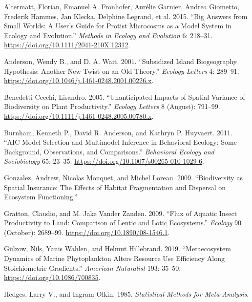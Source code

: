 \documentclass[
]{article}
\newlength{\cslhangindent}
\newlength{\cslentryspacingunit} %
\newenvironment{CSLReferences}[2] %
 {%
  \setlength{\parindent}{0pt}
  \ifodd #1
  \let\oldpar\par
  \def\par{\hangindent=\cslhangindent\oldpar}
  \fi
  \setlength{\parskip}{#2\cslentryspacingunit}
 }%
 {}
\begin{document}
\hypertarget{refs}{}
\begin{CSLReferences}{1}{0}
\leavevmode{}%
Altermatt, Florian, Emanuel A. Fronhofer, Aurélie Garnier, Andrea
Giometto, Frederik Hammes, Jan Klecka, Delphine Legrand, et al. 2015.
{``Big Answers from Small Worlds: A User's Guide for Protist Microcosms
as a Model System in Ecology and Evolution.''} \emph{Methods in Ecology
and Evolution} 6: 218--31.
\url{https://doi.org/10.1111/2041-210X.12312}.

\leavevmode{}%
Anderson, Wendy B., and D. A. Wait. 2001. {``Subsidized Island
Biogeography Hypothesis: Another New Twist on an Old Theory.''}
\emph{Ecology Letters} 4: 289--91.
\url{https://doi.org/10.1046/j.1461-0248.2001.00226.x}.

\leavevmode{}%
Benedetti-Cecchi, Lisandro. 2005. {``Unanticipated Impacts of Spatial
Variance of Biodiversity on Plant Productivity.''} \emph{Ecology
Letters} 8 (August): 791--99.
\url{https://doi.org/10.1111/j.1461-0248.2005.00780.x}.

\leavevmode{}%
Burnham, Kenneth P., David R. Anderson, and Kathryn P. Huyvaert. 2011.
{``AIC Model Selection and Multimodel Inference in Behavioral Ecology:
Some Background, Observations, and Comparisons.''} \emph{Behavioral
Ecology and Sociobiology} 65: 23--35.
\url{https://doi.org/10.1007/s00265-010-1029-6}.

\leavevmode{}%
Gonzalez, Andrew, Nicolas Mouquet, and Michel Loreau. 2009.
{``Biodiversity as Spatial Insurance: The Effects of Habitat
Fragmentation and Dispersal on Ecosystem Functioning.''}

\leavevmode{}%
Gratton, Claudio, and M. Jake Vander Zanden. 2009. {``Flux of Aquatic
Insect Productivity to Land: Comparison of Lentic and Lotic
Ecosystems.''} \emph{Ecology} 90 (October): 2689--99.
\url{https://doi.org/10.1890/08-1546.1}.

\leavevmode{}%
Gülzow, Nils, Yanis Wahlen, and Helmut Hillebrand. 2019.
{``Metaecosystem Dynamics of Marine Phytoplankton Alters Resource Use
Efficiency Along Stoichiometric Gradients.''} \emph{American Naturalist}
193: 35--50. \url{https://doi.org/10.1086/700835}.

\leavevmode{}%
Hedges, Larry V., and Ingram Olkin. 1985. \emph{Statistical Methods for
Meta-Analysis}.


\end{CSLReferences}
\end{document}
